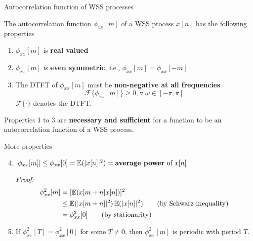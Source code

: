 \documentclass[10pt]{beamer}
\begin{document}
%
\begin{frame}{Autocorrelation function of WSS processes}

The autocorrelation function $\phi_{xx}[m]$ of a WSS process $x[n]$ has the following properties

\begin{enumerate}
	\item $\phi_{xx}[m]$ is \textbf{real valued}
	\item $\phi_{xx}[m]$ is \textbf{even symmetric}, i.e., $\phi_{xx}[m] = \phi_{xx}[-m]$
	\item The DTFT of $\phi_{xx}[m]$ must be \textbf{non-negative at all frequencies}
	\begin{equation}
	\mathcal{F}\{\phi_{xx}[m]\} \geq 0, \forall~\omega\in[-\pi, \pi]
	\end{equation}
	$\mathcal{F}\{\cdot\}$ denotes the DTFT.	
\end{enumerate}

	Properties 1 to 3 are \textbf{necessary and sufficient} for a function to be an autocorrelation function of a WSS process.
\end{frame}

%
\begin{frame}
More properties
\begin{enumerate}\setcounter{enumi}{3}
	\item $|\phi_{xx}[m]| \leq \phi_{xx}[0] = \operatorname{\mathbb{E}}(|x[n]|^2) = \text{\textbf{average power} of}~x[n]$
	
\textit{Proof:}
\begin{align*}
\phi_{xx}^2[m] &= [\operatorname{\mathbb{E}}(x[m+n]x[n])]^2 \\
&\leq \operatorname{\mathbb{E}}(|x[m+n]|^2)\operatorname{\mathbb{E}}(|x[n]|^2) \tag{by Schwarz inequality} \\
&=\phi_{xx}^2[0] \tag{by stationarity}
\end{align*}
	\item If $\phi_{xx}^2[T] = \phi_{xx}^2[0]$ for some $T\neq 0$, then $\phi_{xx}^2[m]$ is periodic with period $T$.
\end{enumerate}
\end{frame}
\end{document}

